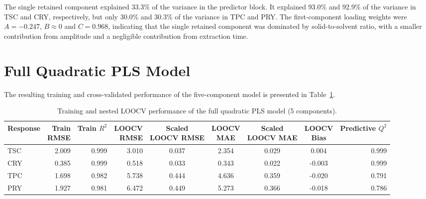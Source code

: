 \documentclass[MScDSA]{uccthesis}
\begin{document}
The single retained component explained 33.3\% of the variance in the predictor block. It explained 93.0\% and 92.9\% of the variance in TSC and CRY, respectively, but only 30.0\% and 30.3\% of the variance in TPC and PRY. The first-component loading weights were $A = -0.247$, $B \approx 0$ and $C = 0.968$, indicating that the single retained component was dominated by solid-to-solvent ratio, with a smaller  contribution from amplitude and a negligible contribution from extraction time.

\section{Full Quadratic PLS Model}
The resulting training and cross-validated performance of the five-component model is presented in Table~\ref{tab:full_quadratic_pls_performance}.

\begin{table}[H]
\centering
\fontsize{10}{12}\selectfont
\setlength{\tabcolsep}{4pt}
\caption{Training and nested LOOCV performance of the full quadratic PLS model (5 components).}
\label{tab:full_quadratic_pls_performance}
\begin{tabular}{lrrrccccr}
\toprule
\textbf{Response} & \makecell{\textbf{Train}\\\textbf{RMSE}} & \makecell{\textbf{Train}\\\textbf{$R^2$}} & \makecell{\textbf{LOOCV}\\\textbf{RMSE}} & \makecell{\textbf{Scaled}\\\textbf{LOOCV RMSE}} &
\makecell{\textbf{LOOCV}\\\textbf{MAE}} & \makecell{\textbf{Scaled}\\\textbf{LOOCV MAE}} & \makecell{\textbf{LOOCV}\\\textbf{Bias}} & \makecell{\textbf{Predictive}\\\textbf{$Q^2$}} \\
\midrule
TSC & 2.009 & 0.999 & 3.010 & 0.037 & 2.354 & 0.029 & 0.004 & 0.999 \\
CRY & 0.385 & 0.999 & 0.518 & 0.033 & 0.343 & 0.022 & -0.003 & 0.999 \\
TPC & 1.698 & 0.982 & 5.738 & 0.444 & 4.636 & 0.359 & -0.020 & 0.791 \\
PRY & 1.927 & 0.981 & 6.472 & 0.449 & 5.273 & 0.366 & -0.018 & 0.786 \\
\bottomrule
\end{tabular}
\end{table}
\end{document}
